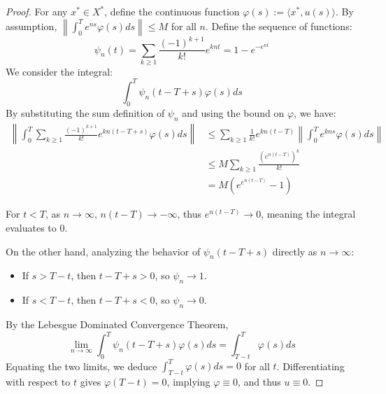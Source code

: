 \documentclass[12pt, oneside]{book}
\newcommand{\norm}[1]{\left\lVert#1\right\rVert}
\begin{document}
\begin{proof}
	For any $x^* \in X^*$, define the continuous function $\varphi(s) := \langle x^*, u(s) \rangle$. By assumption, $\norm{\int_0^T e^{ns} \varphi(s) ds} \le M$ for all $n$. 
Define the sequence of functions:
$$ \psi_n(t) = \sum_{k \ge 1} \frac{(-1)^{k+1}}{k!} e^{knt} = 1 - e^{-e^{nt}} $$ 
We consider the integral:
$$ \int_0^T \psi_n(t - T + s) \varphi(s) ds $$ 
By substituting the sum definition of $\psi_n$ and using the bound on $\varphi$, we have:
\begin{align*}
\norm{\int_0^T \sum_{k \ge 1} \frac{(-1)^{k+1}}{k!} e^{kn(t - T + s)} \varphi(s) ds}
&\le \sum_{k \ge 1} \frac{1}{k!} e^{kn(t - T)} \norm{\int_0^T e^{kns} \varphi(s) ds} \\
&\le M \sum_{k \ge 1} \frac{(e^{n(t-T)})^k}{k!}\\
&= M (e^{e^{n(t-T)}} - 1)
\end{align*}

For $t < T$, as $n \rightarrow \infty$, $n(t-T) \rightarrow -\infty$, thus $e^{n(t-T)} \rightarrow 0$, meaning the integral evaluates to $0$. 

On the other hand, analyzing the behavior of $\psi_n(t - T + s)$ directly as $n \rightarrow \infty$:
\begin{itemize}
    \item If $s > T - t$, then $t - T + s > 0$, so $\psi_n \rightarrow 1$. 
    \item If $s < T - t$, then $t - T + s < 0$, so $\psi_n \rightarrow 0$. 
\end{itemize}
By the Lebesgue Dominated Convergence Theorem, 
$$ \lim_{n \rightarrow \infty} \int_0^T \psi_n(t - T + s) \varphi(s) ds = \int_{T-t}^T \varphi(s) ds $$ 
Equating the two limits, we deduce $\int_{T-t}^T \varphi(s) ds = 0$ for all $t$. 
Differentiating with respect to $t$ gives $\varphi(T-t) = 0$, implying $\varphi \equiv 0$, and thus $u \equiv 0$. 
\end{proof}
\end{document}
